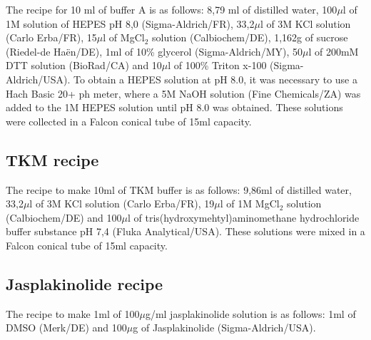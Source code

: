 \documentclass[12pt, a4paper]{article} %
\begin{document}
	The recipe for 10 ml of buffer A is as follows: 8,79 ml of distilled water, 100$\mu$l of 1M solution of HEPES pH 8,0 (Sigma-Aldrich/FR), 33,2$\mu$l of 3M KCl solution (Carlo Erba/FR), 15$\mu$l of MgCl$_{2}$ solution (Calbiochem/DE), 1,162g of sucrose (Riedel-de Haën/DE), 1ml of 10\% glycerol (Sigma-Aldrich/MY), 50$\mu$l of 200mM DTT solution (BioRad/CA) and 10$\mu$l of 100\% Triton x-100 (Sigma-Aldrich/USA). To obtain a HEPES solution at pH 8.0, it was necessary to use a Hach Basic 20+ ph meter, where a 5M NaOH solution (Fine Chemicals/ZA) was added to the 1M HEPES solution until pH 8.0 was obtained. These solutions were collected in a Falcon conical tube of 15ml capacity. 
	
	\subsection{TKM recipe}
	
	The recipe to make 10ml of TKM buffer is as follows: 9,86ml of distilled water, 33,2$\mu$l of 3M KCl solution (Carlo Erba/FR), 19$\mu$l of 1M MgCl$_{2}$ solution (Calbiochem/DE) and 100$\mu$l of tris(hydroxymehtyl)aminomethane hydrochloride buffer substance pH 7,4 (Fluka Analytical/USA). These solutions were mixed in a Falcon conical tube of 15ml capacity.
	
	\subsection{Jasplakinolide recipe}
	
	The recipe to make 1ml of 100$\mu$g/ml jasplakinolide solution is as follows: 1ml of DMSO (Merk/DE) and 100$\mu$g of Jasplakinolide (Sigma-Aldrich/USA).
	
	
	
	
\end{document}
